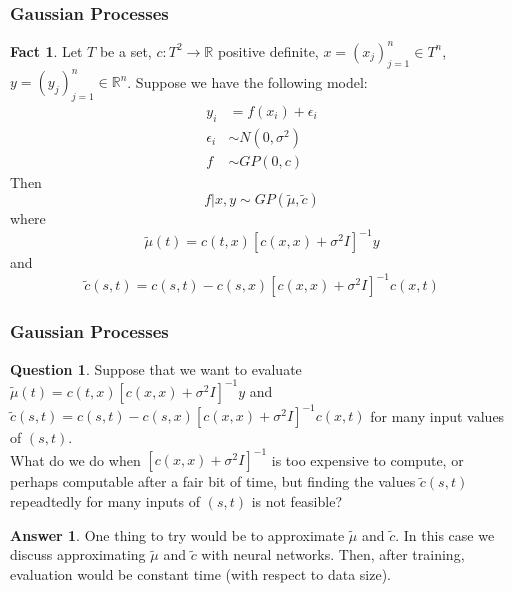 \documentclass[notheorems]{beamer}
\theoremstyle{definition}
\newtheorem{ques}[definition]{Question}
\newtheorem{ans}[definition]{Answer}
\newtheorem{fact}[definition]{Fact}
\newcommand{\ep}{\epsilon}
\newcommand{\sig}{\sigma}
\newcommand{\R}{\mathbb{R}}
\begin{document}
\begin{frame}
\frametitle{Gaussian Processes}

\begin{fact}
Let $T$ be a set, $c: T^2 \rightarrow \R$ positive definite, $x = (x_j)_{j=1}^n \in T^n$, $y = (y_j)_{j=1}^n \in \R^n$. Suppose we have the following model:
\begin{align*}
y_i &= f(x_i) + \ep_i \\
\ep_i &\sim N(0, \sig^2) \\
f &\sim GP(0, c)
\end{align*}
Then $$f|x, y \sim GP(\tilde{\mu}, \tilde{c})$$ where $$\tilde{\mu}(t) = c(t, x)[c(x,x) + \sig^2I]^{-1}y$$ and $$\tilde{c}(s,t) = c(s,t) - c(s,x)[c(x,x) + \sig^2 I]^{-1}c(x,t)$$

\end{fact}
\end{frame}














\begin{frame}
\frametitle{Gaussian Processes}

\begin{ques}
Suppose that we want to evaluate $\tilde{\mu}(t) = c(t, x)[c(x,x) + \sig^2I]^{-1}y$ and $\tilde{c}(s,t) = c(s,t) - c(s,x)[c(x,x) + \sig^2 I]^{-1}c(x,t)$ for many input values of $(s,t)$. \\
What do we do when $[c(x,x) + \sig^2 I]^{-1}$ is too expensive to compute, or perhaps computable after a fair bit of time, but finding the values $\tilde{c}(s,t)$ repeadtedly for many inputs of $(s,t)$ is not feasible? 
\end{ques}

\pause
\begin{ans}
One thing to try would be to approximate $\tilde{\mu}$ and $\tilde{c}$. In this case we discuss approximating $\tilde{\mu}$ and $\tilde{c}$ with neural networks. Then, after training, evaluation would be constant time (with respect to data size).
\end{ans}

\end{frame}
\end{document}
